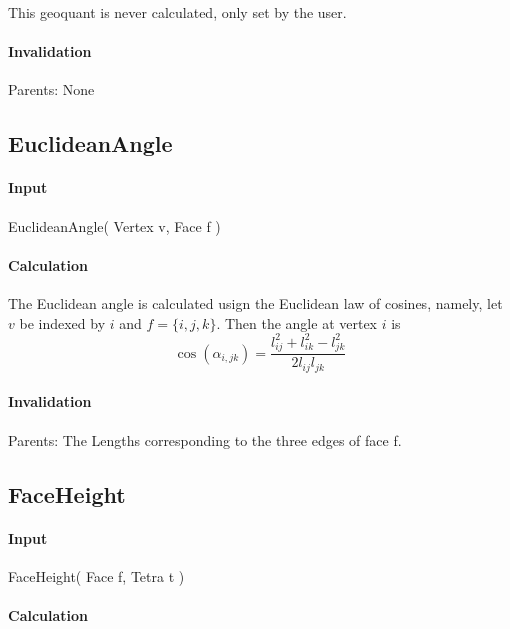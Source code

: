 This geoquant is never calculated, only set by the user.

\paragraph{Invalidation}

Parents: None

\bigskip

\subsection{EuclideanAngle}

\paragraph{Input}

EuclideanAngle( Vertex v, Face f )

\paragraph{Calculation}

The Euclidean angle is calculated usign the Euclidean law of cosines,
namely, let $v$ be indexed by $i$ and $f=\{i,j,k\}$. Then the angle at
vertex $i$ is%
\begin{equation*}
\cos (\alpha _{i,jk})=\frac{l_{ij}^{2}+l_{ik}^{2}-l_{jk}^{2}}{2l_{ij}l_{jk}}
\end{equation*}

\paragraph{Invalidation}

\bigskip Parents: The Lengths corresponding to the three edges of face f.

\subsection{FaceHeight}

\paragraph{Input}

FaceHeight( Face f, Tetra t )

\paragraph{Calculation}


